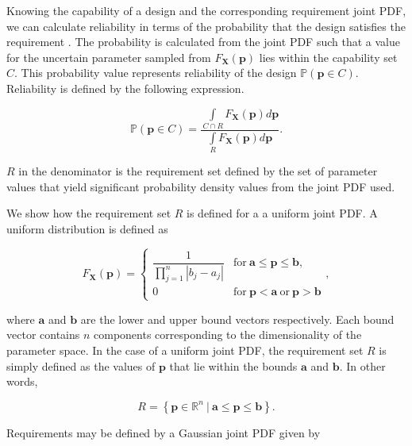 Knowing the capability of a design and the corresponding requirement joint \ac{PDF}, we can calculate reliability in terms of the probability that the design satisfies the requirement \cite{ForouzandehShahraki2014,Bucher2009}. The probability is calculated from the joint \ac{PDF} such that a value for the uncertain parameter sampled from $F_{\mathbf{X}}\left(\mathbf{p}\right)$ lies within the capability set $C$. This probability value represents reliability of the design $\mathbb{P}(\mathbf{p} \in C)$. Reliability is defined by the following expression.

\begin{equation} \label{eq:reliability}
	\mathbb{P}(\mathbf{p} \in C) = \dfrac{\int\limits_{C\cap R} F_{\mathbf{X}}(\mathbf{p}) d\mathbf{p}}{\int\limits_{R} F_{\mathbf{X}}(\mathbf{p}) d\mathbf{p}}.
\end{equation}

$R$ in the denominator is the requirement set defined by the set of parameter values that yield significant probability density values from the joint \ac{PDF} used. 

We show how the requirement set $R$ is defined for a a uniform joint \ac{PDF}. A uniform distribution is defined as

\begin{equation} \label{eq:uniformpdf}
	F_\mathbf{X}(\mathbf{p})={\begin{cases}{\dfrac {1}{\prod\limits_{j=1}^{n} \left|b_j - a_j\right|}}&\mathrm {for} \ \mathbf{a}\leq \mathbf{p}\leq \mathbf{b},\\[8pt]0&\mathrm {for} \ \mathbf{p}<\mathbf{a}\ \mathrm {or} \ \mathbf{p}>\mathbf{b}\end{cases}},
\end{equation}

where $\mathbf{a}$ and $\mathbf{b}$ are the lower and upper bound vectors respectively. Each bound vector contains $n$ components corresponding to the dimensionality of the parameter space. In the case of a uniform joint \ac{PDF}, the requirement set $R$ is simply defined as the values of $\mathbf{p}$ that lie within the bounds $\mathbf{a}$ and $\mathbf{b}$. In other words,

\begin{equation} \label{eq:requirementsetuniform}
	\textit{R} = \left\{\mathbf{p} \in \mathbb{R}^n~|~\mathbf{a}\leq \mathbf{p}\leq \mathbf{b}\right\}.
\end{equation}

Requirements may be defined by a Gaussian joint \ac{PDF} given by

